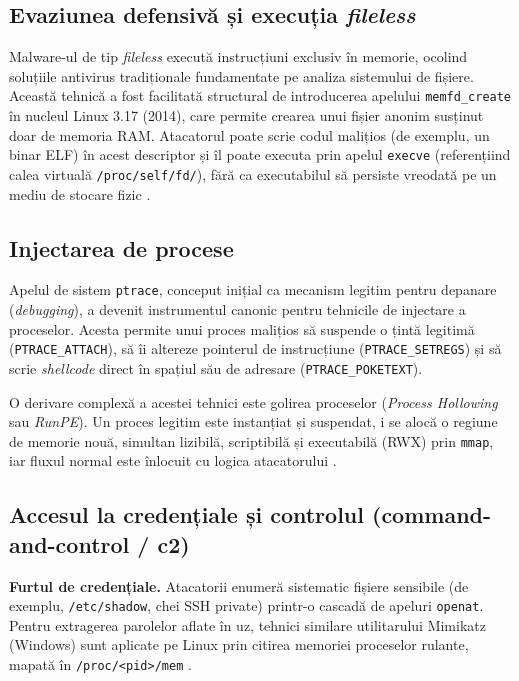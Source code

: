 \subsection{Evaziunea defensivă și execuția \textit{fileless}}
\label{subsec:fileless}

\par Malware-ul de tip \textit{fileless} execută instrucțiuni exclusiv în memorie, ocolind soluțiile antivirus tradiționale fundamentate pe analiza sistemului de fișiere. Această tehnică a fost facilitată structural de introducerea apelului \texttt{memfd\_create} în nucleul Linux 3.17 (2014), care permite crearea unui fișier anonim susținut doar de memoria RAM. Atacatorul poate scrie codul malițios (de exemplu, un binar ELF) în acest descriptor și îl poate executa prin apelul \texttt{execve} (referențiind calea virtuală \texttt{/proc/self/fd/}), fără ca executabilul să persiste vreodată pe un mediu de stocare fizic \cite{Gruss2016}.

\subsection{Injectarea de procese}
\label{subsec:process_injection}

\par Apelul de sistem \texttt{ptrace}, conceput inițial ca mecanism legitim pentru depanare (\textit{debugging}), a devenit instrumentul canonic pentru tehnicile de injectare a proceselor. Acesta permite unui proces malițios să suspende o țintă legitimă (\texttt{PTRACE\_ATTACH}), să îi altereze pointerul de instrucțiune (\texttt{PTRACE\_SETREGS}) și să scrie \textit{shellcode} direct în spațiul său de adresare (\texttt{PTRACE\_POKETEXT}).

\par O derivare complexă a acestei tehnici este golirea proceselor (\textit{Process Hollowing} sau \textit{RunPE}). Un proces legitim este instanțiat și suspendat, i se alocă o regiune de memorie nouă, simultan lizibilă, scriptibilă și executabilă (RWX) prin \texttt{mmap}, iar fluxul normal este înlocuit cu logica atacatorului \cite{Elastic2022}.

\subsection{Accesul la credențiale și controlul (command-and-control / c2)}
\label{subsec:c2}

\par \textbf{Furtul de credențiale.} Atacatorii enumeră sistematic fișiere sensibile (de exemplu, \texttt{/etc/shadow}, chei SSH private) printr-o cascadă de apeluri \texttt{openat}. Pentru extragerea parolelor aflate în uz, tehnici similare utilitarului Mimikatz (Windows) sunt aplicate pe Linux prin citirea memoriei proceselor rulante, mapată în \texttt{/proc/<pid>/mem} \cite{Bundles2021}.


